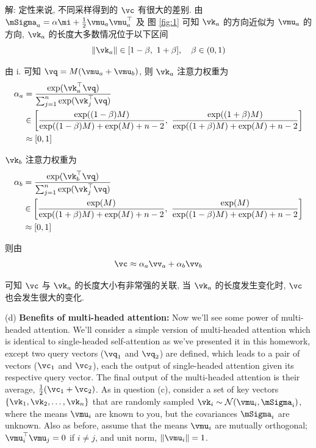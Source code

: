 \documentclass[openany]{ctexbook}
\theoremstyle{kaiti}
\theoremstyle{normal}
\begin{document}
解: 定性来说, 不同采样得到的 $\vc$ 有很大的差别. 由 $\mSigma_{a}=\alpha \mi+\frac{1}{2}\vmu_{a} \vmu_{a}^{\top}$ 及 图 \ref{fig:1} 可知 $\vk_a$ 的方向近似为 $\vmu_a$ 的方向, $\vk_a$ 的长度大多数情况位于以下区间
\begin{equation}
  \|\vk_a\|\in[1-\beta,~1+\beta],\quad\beta\in(0,1)
\end{equation}

由 i. 可知 $\vq=M(\vmu_a+\vmu_b)$, 则 $\vk_a$ 注意力权重为
\begin{equation}
  \begin{aligned}
    \alpha_a
    &=\frac{\exp(\vk_{a}^{\top}\vq)}{\sum_{j=1}^{n}\exp(\vk_{j}^{\top}\vq)}\\
    &\in\left[\frac{\exp((1-\beta)M)}{\exp((1-\beta)M)+\exp(M)+n-2},~\frac{\exp((1+\beta)M)}{\exp((1+\beta)M)+\exp(M)+n-2}\right]\\
    &\approx[0,1]\\
  \end{aligned}
\end{equation}

$\vk_b$ 注意力权重为
\begin{equation}
  \begin{aligned}
    \alpha_b
    &=\frac{\exp(\vk_{b}^{\top}\vq)}{\sum_{j=1}^{n}\exp(\vk_{j}^{\top}\vq)}\\
    &\in\left[\frac{\exp(M)}{\exp((1+\beta)M)+\exp(M)+n-2},~\frac{\exp(M)}{\exp((1-\beta)M)+\exp(M)+n-2}\right]\\
    &\approx[0,1]\\
  \end{aligned}
\end{equation}

则由
\begin{equation}
  \vc\approx\alpha_a\vv_a+\alpha_b\vv_b
\end{equation}

可知 $\vc$ 与 $\vk_a$ 的长度大小有非常强的关联, 当 $\vk_a$ 的长度发生变化时, $\vc$ 也会发生很大的变化.

(d) \textbf{Benefits of multi-headed attention:} Now we'll see some power of multi-headed attention. We'll consider a simple version of multi-headed attention which is identical to single-headed self-attention as we've presented it in this homework, except two query vectors ($\vq_1$ and $\vq_2$) are defined, which leads to a pair of vectors ($\vc_1$ and $\vc_2$), each the output of single-headed attention given its respective query vector. The final output of the multi-headed attention is their average, $\frac{1}{2}(\vc_{1}+\vc_{2})$. As in question (c), consider a set of key vectors $\{\vk_{1},\vk_2,\dots, \vk_{n}\}$ that are randomly sampled $\vk_{i} \sim \mathcal{N}(\vmu_{i}, \mSigma_{i})$, where the means $\vmu_i$ are known to you, but the covariances $\mSigma_{i}$ are unknown. Also as before, assume that the means $\vmu_i$ are mutually orthogonal; $\vmu_{i}^{\top} \vmu_{j}=0$ if $i \neq j$, and unit norm, $\|\vmu_{i}\|=1$.
\end{document}
